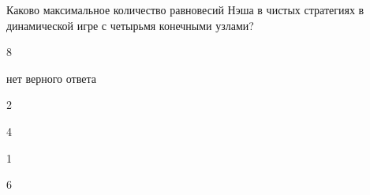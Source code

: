 
\begin{question}
Каково максимальное количество равновесий Нэша в чистых стратегиях в динамической игре с четырьмя конечными узлами?
\begin{answerlist}
  \item 8
  \item нет верного ответа
  \item 2
  \item 4
  \item 1
  \item 6
\end{answerlist}
\end{question}


